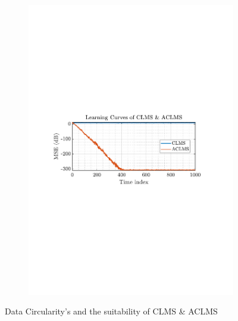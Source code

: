 \documentclass[12pt]{article}
\begin{document}
\begin{figure}[H]
\begin{subfigure}{0.49\textwidth}
					\captionsetup{justification=centering}
				\end{subfigure}
				\begin{subfigure}{0.49\textwidth}
					\centering
					\includegraphics[trim={2.2cm 11.2cm 3.00cm  11.2cm}, clip, width=\textwidth]{../MATLAB/figures/q3_1a_fig02.pdf} 
					\captionsetup{justification=centering}
				\end{subfigure}
				
				\captionsetup{justification=centering}
				\caption{Data Circularity's and the suitability of CLMS \& ACLMS}
				\label{fig: 3-1a}
			\end{figure}
	
\end{document}
